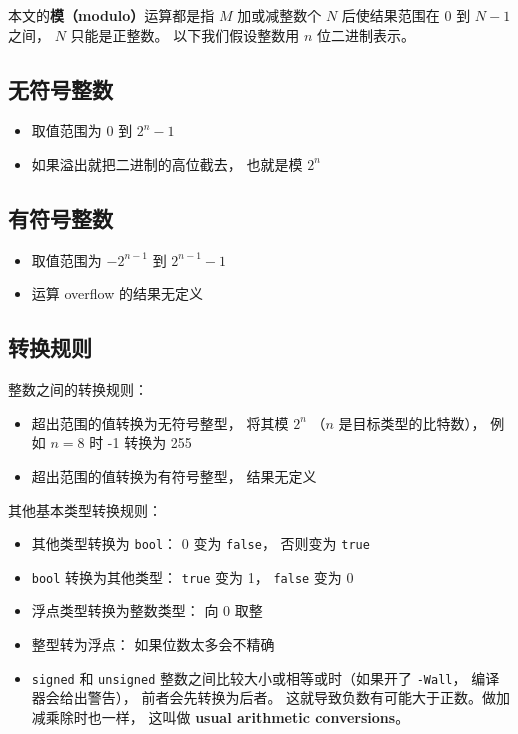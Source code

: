 

本文的\textbf{模（modulo）}运算都是指 $M$ 加或减整数个 $N$ 后使结果范围在 $0$ 到 $N-1$ 之间， $N$ 只能是正整数。 以下我们假设整数用 $n$ 位二进制表示。

\subsection{无符号整数}
\begin{itemize}
\item 取值范围为 $0$ 到 $2^n-1$
\item 如果溢出就把二进制的高位截去， 也就是模 $2^n$
\end{itemize}

\subsection{有符号整数}
\begin{itemize}
\item 取值范围为 $-2^{n-1}$ 到 $2^{n-1}-1$
\item 运算 overflow 的结果无定义
\end{itemize}

\subsection{转换规则}
整数之间的转换规则：
\begin{itemize}
\item 超出范围的值转换为无符号整型， 将其模 $2^n$ （$n$ 是目标类型的比特数）， 例如 $n = 8$ 时 -1 转换为 255
\item 超出范围的值转换为有符号整型， 结果无定义
\end{itemize}
其他基本类型转换规则：
\begin{itemize}
\item 其他类型转换为 \verb|bool|： 0 变为 \verb|false|， 否则变为 \verb|true|
\item \verb|bool| 转换为其他类型： \verb|true| 变为 1， \verb|false| 变为 0
\item 浮点类型转换为整数类型： 向 0 取整
\item 整型转为浮点： 如果位数太多会不精确
\item \verb|signed| 和 \verb|unsigned| 整数之间比较大小或相等或时（如果开了 \verb|-Wall|， 编译器会给出警告）， 前者会先转换为后者。 这就导致负数有可能大于正数。做加减乘除时也一样， 这叫做 \textbf{usual arithmetic conversions}。
\end{itemize}

